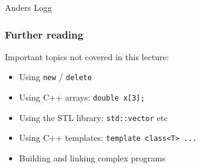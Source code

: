 \documentclass{fenicscourse}
\begin{document}
              {Anders Logg}





\begin{frame}
  \frametitle{Further reading}

  Important topics not covered in this lecture:

  \begin{itemize}
  \item
    Using \texttt{new} / \texttt{delete}
  \item
    Using C++ arrays: \texttt{double x[3];}
  \item
    Using the STL library: \texttt{std::vector} etc
  \item
    Using C++ templates: \texttt{template class<T> ...}
  \item
    Building and linking complex programs
  \end{itemize}

\end{frame}
\end{document}
